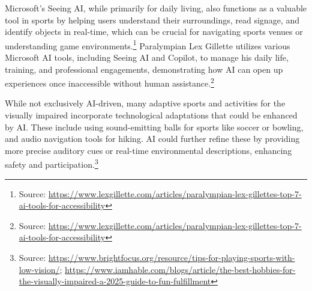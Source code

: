 Microsoft's Seeing AI, while primarily for daily living, also functions as a valuable tool in sports by helping users understand their surroundings, read signage, and identify objects in real-time, which can be crucial for navigating sports venues or understanding game environments.\footnote{Source: \url{https://www.lexgillette.com/articles/paralympian-lex-gillettes-top-7-ai-tools-for-accessibility}} Paralympian Lex Gillette utilizes various Microsoft AI tools, including Seeing AI and Copilot, to manage his daily life, training, and professional engagements, demonstrating how AI can open up experiences once inaccessible without human assistance.\footnote{Source: \url{https://www.lexgillette.com/articles/paralympian-lex-gillettes-top-7-ai-tools-for-accessibility}}

While not exclusively AI-driven, many adaptive sports and activities for the visually impaired incorporate technological adaptations that could be enhanced by AI. These include using sound-emitting balls for sports like soccer or bowling, and audio navigation tools for hiking. AI could further refine these by providing more precise auditory cues or real-time environmental descriptions, enhancing safety and participation.\footnote{Source: \url{https://www.brightfocus.org/resource/tips-for-playing-sports-with-low-vision/}; \url{https://www.iamhable.com/blogs/article/the-best-hobbies-for-the-visually-impaired-a-2025-guide-to-fun-fulfillment}}

